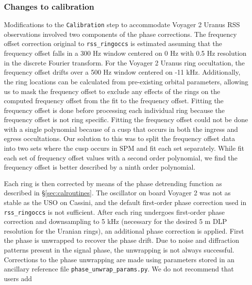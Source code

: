\documentclass[titlepage, 12pt]{article}
\begin{document}
           \subsubsection{Changes to calibration}
           Modifications to the \texttt{Calibration} step to accommodate Voyager 2 Uranus RSS observations involved two components of the phase corrections. The
           frequency offset correction original to \texttt{rss\_ringoccs} is estimated assuming that the
           frequency offset falls in a 300 Hz window centered on 0 Hz with 0.5 Hz resolution in the
           discrete Fourier transform. For the Voyager 2 Uranus ring occultation, the frequency offset drifts
           over a 500 Hz window centered on -11 kHz. Additionally, the ring locations can be
           calculated from pre-existing orbital parameters, allowing us to mask the frequency offset
           to exclude any effects of the rings on the computed frequency offset from the fit to the
           frequency offset. Fitting the frequency offset is done before processing each individual
           ring because the frequency offset is not ring specific. Fitting the frequency offset
           could not be done with a single polynomial because of a cusp that occurs in both the
           ingress and egress occultations. Our solution to this was to split the frequency offset
           data into two sets where the cusp occurs in SPM and fit each set separately. While 
           \citet{Gresh1989} fit each set of frequency offset values with a second order polynomial, 
           we find the frequency offset is better described by a ninth order polynomial.
           \par\hfill\par
           Each ring is then corrected by means of the phase detrending function as described in \S\ref{sec:calroutines}.
           The oscillator on board Voyager 2 was not as stable as the USO on Cassini, 
           and the default first-order phase correction used in \texttt{rss\_ringoccs} is not 
           sufficient. After each ring undergoes first-order phase correction and downsampling to 5 kHz
           (necessary for the desired 5 m DLP resolution for the Uranian rings), an additional phase
           correction is applied. First the phase is unwrapped to recover the phase drift. Due to
           noise and diffraction patterns present in the signal phase, the unwrapping is not always
           successful. Corrections to the phase unwrapping are made using parameters stored in an
           ancillary reference file \texttt{phase\_unwrap\_params.py}. We do not recommend that users add 
\end{document}
